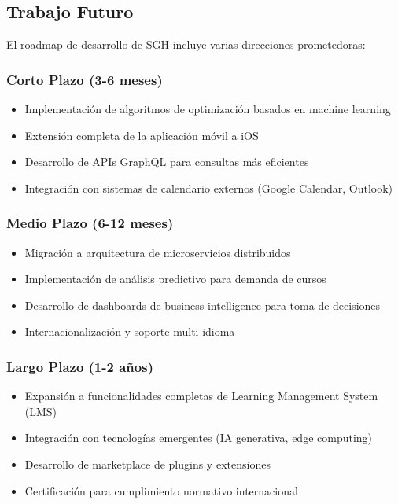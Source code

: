 \subsection{Trabajo Futuro}

El roadmap de desarrollo de SGH incluye varias direcciones prometedoras:

\subsubsection{Corto Plazo (3-6 meses)}
\begin{itemize}
\item Implementación de algoritmos de optimización basados en machine learning
\item Extensión completa de la aplicación móvil a iOS
\item Desarrollo de APIs GraphQL para consultas más eficientes
\item Integración con sistemas de calendario externos (Google Calendar, Outlook)
\end{itemize}

\subsubsection{Medio Plazo (6-12 meses)}
\begin{itemize}
\item Migración a arquitectura de microservicios distribuidos
\item Implementación de análisis predictivo para demanda de cursos
\item Desarrollo de dashboards de business intelligence para toma de decisiones
\item Internacionalización y soporte multi-idioma
\end{itemize}

\subsubsection{Largo Plazo (1-2 años)}
\begin{itemize}
\item Expansión a funcionalidades completas de Learning Management System (LMS)
\item Integración con tecnologías emergentes (IA generativa, edge computing)
\item Desarrollo de marketplace de plugins y extensiones
\item Certificación para cumplimiento normativo internacional
\end{itemize}

